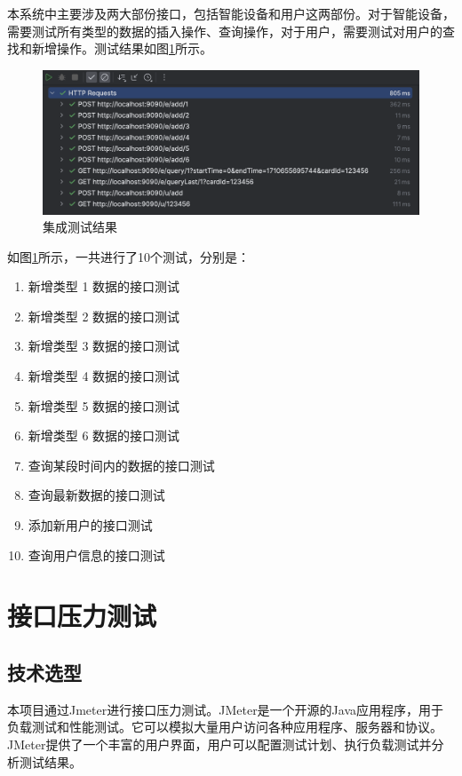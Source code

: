 \documentclass[oneside]{xduugthesis}
\begin{document}
本系统中主要涉及两大部份接口，包括智能设备和用户这两部份。对于智能设备，需要测试所有类型的数据的插入操作、查询操作，对于用户，需要测试对用户的查找和新增操作。测试结果如图\ref{fig:rest-test-result}所示。

\begin{figure}[htb]
    \centering
    \includegraphics[width=0.75\linewidth]{yoyo-tex//images/rest-test-result.png}
    \caption{集成测试结果}
    \label{fig:rest-test-result}
\end{figure}

如图\ref{fig:rest-test-result}所示，一共进行了10个测试，分别是：

\begin{enumerate}[nosep]
    \item 新增类型 1 数据的接口测试
    \item 新增类型 2 数据的接口测试
    \item 新增类型 3 数据的接口测试
    \item 新增类型 4 数据的接口测试
    \item 新增类型 5 数据的接口测试
    \item 新增类型 6 数据的接口测试
    \item 查询某段时间内的数据的接口测试
    \item 查询最新数据的接口测试
    \item 添加新用户的接口测试
    \item 查询用户信息的接口测试
\end{enumerate}

\section{接口压力测试}

\subsection{技术选型}

本项目通过Jmeter进行接口压力测试。JMeter是一个开源的Java应用程序，用于负载测试和性能测试。它可以模拟大量用户访问各种应用程序、服务器和协议。JMeter提供了一个丰富的用户界面，用户可以配置测试计划、执行负载测试并分析测试结果。
\end{document}
